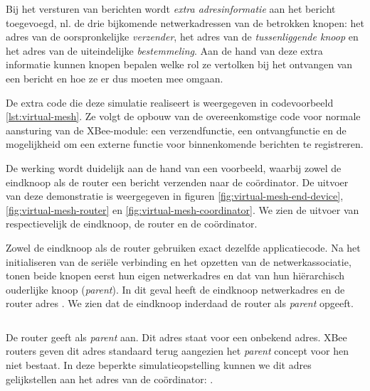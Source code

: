 Bij het versturen van berichten wordt \emph{extra adresinformatie} aan het
bericht toegevoegd, nl. de drie bijkomende netwerkadressen van de betrokken
knopen: het adres van de oorspronkelijke \emph{verzender}, het adres van de
\emph{tussenliggende knoop} en het adres van de uiteindelijke
\emph{bestemmeling}. Aan de hand van deze extra informatie kunnen knopen
bepalen welke rol ze vertolken bij het ontvangen van een bericht en hoe ze er
dus moeten mee omgaan.

De extra code die deze simulatie realiseert is weergegeven in codevoorbeeld
\ref{lst:virtual-mesh}. Ze volgt de opbouw van de overeenkomstige code voor
normale aansturing van de XBee-module: een verzendfunctie, een ontvangfunctie
en de mogelijkheid om een externe functie voor binnenkomende berichten te
registreren.

De werking wordt duidelijk aan de hand van een voorbeeld, waarbij zowel de
eindknoop als de router een bericht verzenden naar de co\"ordinator. De
uitvoer van deze demonstratie is weergegeven in figuren
\ref{fig:virtual-mesh-end-device}, \ref{fig:virtual-mesh-router} en
\ref{fig:virtual-mesh-coordinator}. We zien de uitvoer van respectievelijk de
eindknoop, de router en de co\"ordinator.

Zowel de eindknoop als de router gebruiken exact dezelfde applicatiecode. Na
het initialiseren van de seri\"ele verbinding en het opzetten van de
netwerkassociatie, tonen beide knopen eerst hun eigen netwerkadres en dat van
hun hi\"erarchisch ouderlijke knoop (\emph{parent}). In dit geval heeft de
eindknoop netwerkadres  en de router adres . We zien dat
de eindknoop inderdaad de router als \emph{parent} opgeeft.

\inputminted[linenos,frame=lines,framesep=2mm,fontsize=\footnotesize,firstline=97,firstnumber=97]{c}{../src/demo/lib/network.c}
\vspace{-5mm}
\vspace{3mm}

\setlength{\parindent}{15pt} %

De router geeft als \emph{parent}  aan. Dit adres staat voor een
onbekend adres. XBee routers geven dit adres standaard terug aangezien het
\emph{parent} concept voor hen niet bestaat. In deze beperkte
simulatieopstelling kunnen we dit adres gelijkstellen aan het adres van de
co\"ordinator: .

